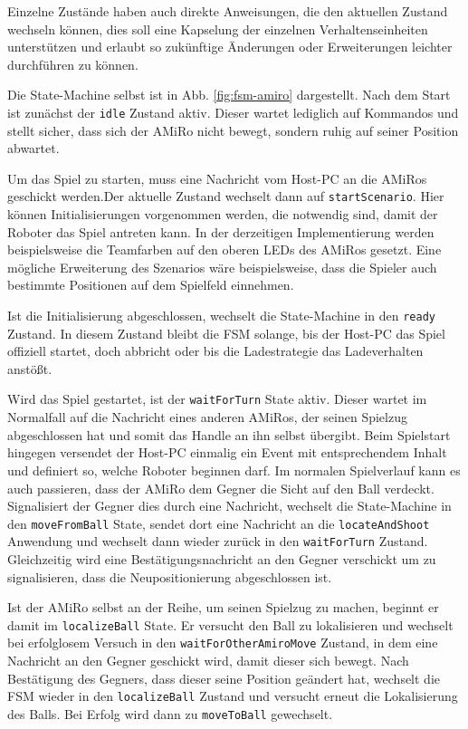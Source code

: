 Einzelne Zustände haben auch direkte Anweisungen, die den aktuellen Zustand wechseln können, dies soll eine Kapselung der einzelnen Verhaltenseinheiten unterstützen und erlaubt so zukünftige Änderungen oder Erweiterungen leichter durchführen zu können.

Die State-Machine selbst ist in Abb. \ref{fig:fsm-amiro} dargestellt. Nach dem Start ist zunächst der \texttt{idle} Zustand aktiv. Dieser wartet lediglich auf Kommandos und stellt sicher, dass sich der AMiRo nicht bewegt, sondern ruhig auf seiner Position abwartet.

Um das Spiel zu starten, muss eine Nachricht vom Host-PC an die AMiRos geschickt werden.Der aktuelle Zustand wechselt dann auf \texttt{startScenario}. Hier können Initialisierungen vorgenommen werden, die notwendig sind, damit der Roboter das Spiel antreten kann. In der derzeitigen Implementierung werden beispielsweise die Teamfarben auf den oberen LEDs des AMiRos gesetzt. Eine mögliche Erweiterung des Szenarios wäre beispielsweise, dass die Spieler auch bestimmte Positionen auf dem Spielfeld einnehmen.

Ist die Initialisierung abgeschlossen, wechselt die State-Machine in den \texttt{ready} Zustand. In diesem Zustand bleibt die FSM solange, bis der Host-PC das Spiel offiziell startet, doch abbricht oder bis die Ladestrategie das Ladeverhalten anstößt.

Wird das Spiel gestartet, ist der \texttt{waitForTurn} State aktiv. Dieser wartet im Normalfall auf die Nachricht eines anderen AMiRos, der seinen Spielzug abgeschlossen hat und somit das Handle an ihn selbst übergibt. Beim Spielstart hingegen versendet der Host-PC einmalig ein Event mit entsprechendem Inhalt und definiert so, welche Roboter beginnen darf. Im normalen Spielverlauf kann es auch passieren, dass der AMiRo dem Gegner die Sicht auf den Ball verdeckt. Signalisiert der Gegner dies durch eine Nachricht, wechselt die State-Machine in den \texttt{moveFromBall} State, sendet dort eine Nachricht an die \texttt{locateAndShoot} Anwendung und wechselt dann wieder zurück in den \texttt{waitForTurn} Zustand. Gleichzeitig wird eine Bestätigungsnachricht an den Gegner verschickt um zu signalisieren, dass die Neupositionierung abgeschlossen ist.

Ist der AMiRo selbst an der Reihe, um seinen Spielzug zu machen, beginnt er damit im \texttt{localizeBall} State. Er versucht den Ball zu lokalisieren und wechselt bei erfolglosem Versuch in den \texttt{waitForOtherAmiroMove} Zustand, in dem eine Nachricht an den Gegner geschickt wird, damit dieser sich bewegt. Nach Bestätigung des Gegners, dass dieser seine Position geändert hat, wechselt die FSM wieder in den \texttt{localizeBall} Zustand und versucht erneut die Lokalisierung des Balls. Bei Erfolg wird dann zu \texttt{moveToBall} gewechselt.

